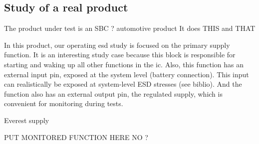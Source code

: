 \subsection{Study of a real product}
\label{sec:real-product-study}

The product under test is an SBC ?
automotive product
It does THIS and THAT

In this product, our operating \gls{esd} study is focused on the primary supply function.
It is an interesting study case because this block is responsible for starting and waking up all other functions in the \gls{ic}.
Also, this function has an external input pin, exposed at the system level (battery connection).
This input can realistically be exposed at system-level ESD stresses (see biblio).
And the function also has an external output pin, the regulated supply, which is convenient for monitoring during tests.


Everest supply

PUT MONITORED FUNCTION HERE NO ?
